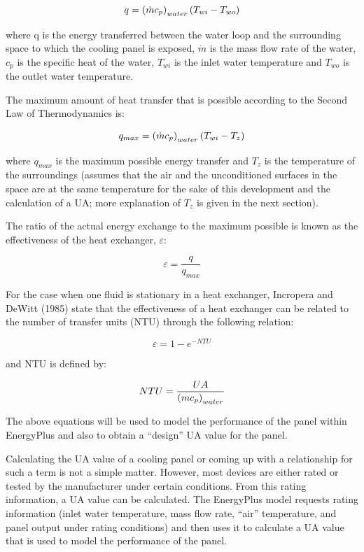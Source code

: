 {\begin{equation}
q = \left(\dot{m} c_p\right)_{water} \left(T_{wi}-T_{wo}\right)
\end{equation}

where q is the energy transferred between the water loop and the surrounding space to which the cooling panel is exposed, \(\dot{m}\) is the mass flow rate of the water, \(c_p\) is the specific heat of the water, \(T_{wi}\) is the inlet water temperature and \(T_{wo}\) is the outlet water temperature.

The maximum amount of heat transfer that is possible according to the Second Law of Thermodynamics is:

\begin{equation}
q_{max} = \left(\dot{m} c_p\right)_{water} \left(T_{wi} - T_z\right)
\end{equation}

where \(q_{max}\) is the maximum possible energy transfer and \(T_z\) is the temperature of the surroundings (assumes that the air and the unconditioned surfaces in the space are at the same temperature for the sake of this development and the calculation of a UA; more explanation of \(T_z\) is given in the next section).

The ratio of the actual energy exchange to the maximum possible is known as the effectiveness of the heat exchanger, $\varepsilon$:

\begin{equation}
\varepsilon = \frac{q}{q_{max}}
\end{equation}

For the case when one fluid is stationary in a heat exchanger, Incropera and DeWitt (1985) state that the effectiveness of a heat exchanger can be related to the number of transfer units (NTU) through the following relation:

\begin{equation}
\varepsilon = 1 - e^{-NTU}
\end{equation}

and NTU is defined by:

\begin{equation}
NTU = \frac{UA}{ \left(m c_p\right)_{water} }
\end{equation}

The above equations will be used to model the performance of the panel within EnergyPlus and also to obtain a “design” UA value for the panel.

Calculating the UA value of a cooling panel or coming up with a relationship for such a term is not a simple matter.  However, most devices are either rated or tested by the manufacturer under certain conditions.  From this rating information, a UA value can be calculated.  The EnergyPlus model requests rating information (inlet water temperature, mass flow rate, “air” temperature, and panel output under rating conditions) and then uses it to calculate a UA value that is used to model the performance of the panel.

}
